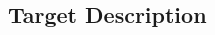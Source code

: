 \documentclass[class=book, crop=false]{standalone}
\begin{document}
\begin{CJK}{UTF8}{gbsn}

\chapter{Target Description}













\cleardoublepage

\end{CJK}
\end{document}
